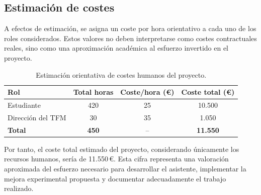 \subsection{Estimación de costes}

A efectos de estimación, se asigna un coste por hora orientativo a cada uno de los roles considerados. Estos valores no deben interpretarse como costes contractuales reales, sino como una aproximación académica al esfuerzo invertido en el proyecto.

\begin{table}[H]
\centering
\begin{tabular}{lccc}
\toprule
\textbf{Rol} & \textbf{Total horas} & \textbf{Coste/hora (€)} & \textbf{Coste total (€)} \\
\midrule
Estudiante & 420 & 25 & 10.500 \\
Dirección del TFM & 30 & 35 & 1.050 \\
\midrule
\textbf{Total} & \textbf{450} & -- & \textbf{11.550} \\
\bottomrule
\end{tabular}
\caption{Estimación orientativa de costes humanos del proyecto.}
\label{tab:costes_proyecto}
\end{table}

Por tanto, el coste total estimado del proyecto, considerando únicamente los recursos humanos, sería de 11.550\,€. 
Esta cifra representa una valoración aproximada del esfuerzo necesario para desarrollar el asistente, implementar la mejora experimental propuesta y documentar adecuadamente el trabajo realizado.

